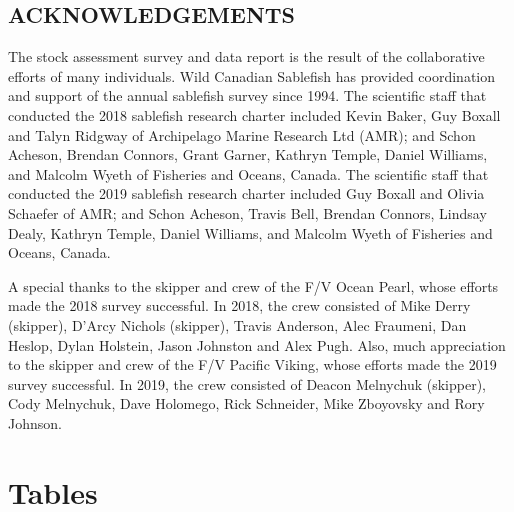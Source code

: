 \documentclass[12pt]{article}\usepackage[]{graphicx}\usepackage[]{color}
\begin{document}
\hypertarget{acknowledgements}{%
\subsection{ACKNOWLEDGEMENTS}\label{acknowledgements}}

The stock assessment survey and data report is the result of the collaborative efforts of many individuals. Wild Canadian Sablefish has provided coordination and support of the annual sablefish survey since 1994. The scientific staff that conducted the 2018 sablefish research charter included Kevin Baker, Guy Boxall and Talyn Ridgway of Archipelago Marine Research Ltd (AMR); and Schon Acheson, Brendan Connors, Grant Garner, Kathryn Temple, Daniel Williams, and Malcolm Wyeth of Fisheries and Oceans, Canada. The scientific staff that conducted the 2019 sablefish research charter included Guy Boxall and Olivia Schaefer of AMR; and Schon Acheson, Travis Bell, Brendan Connors, Lindsay Dealy, Kathryn Temple, Daniel Williams, and Malcolm Wyeth of Fisheries and Oceans, Canada.

A special thanks to the skipper and crew of the F/V Ocean Pearl, whose efforts made the 2018 survey successful. In 2018, the crew consisted of Mike Derry (skipper), D'Arcy Nichols (skipper), Travis Anderson, Alec Fraumeni, Dan Heslop, Dylan Holstein, Jason Johnston and Alex Pugh. Also, much appreciation to the skipper and crew of the F/V Pacific Viking, whose efforts made the 2019 survey successful. In 2019, the crew consisted of Deacon Melnychuk (skipper), Cody Melnychuk, Dave Holomego, Rick Schneider, Mike Zboyovsky and Rory Johnson.

\clearpage

\hypertarget{tables}{%
\section{Tables}\label{tables}}
\end{document}
